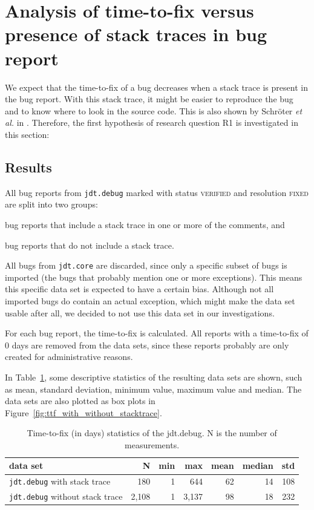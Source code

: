 \section{Analysis of time-to-fix versus presence of stack traces in bug report} %
\label{sec:analysis_of_ttf_vs_presence_of_stack_trace_in_bug_report}
We expect that the time-to-fix of a bug decreases when a stack trace is present in the bug report. With this stack trace, it might be easier to reproduce the bug and to know where to look in the source code. This is also shown by Schr\"{o}ter \emph{et al.} in \cite{Schroter2010}. Therefore, the first hypothesis of research question R1 is investigated in this section:

\vspace{\baselineskip}
\hypba{}

\subsection{Results} %
All bug reports from \texttt{jdt.debug} marked with status \textsc{verified} and resolution \textsc{fixed} are split into two groups: 

\begin{enumerate*}
	\item bug reports that include a stack trace in one or more of the comments, and
	\item bug reports that do not include a stack trace.
\end{enumerate*}

All bugs from \texttt{jdt.core} are discarded, since only a specific subset of bugs is imported (the bugs that probably mention one or more exceptions). This means this specific data set is expected to have a certain bias. Although not all imported bugs do contain an actual exception, which might make the data set usable after all, we decided to not use this data set in our investigations.

For each bug report, the time-to-fix is calculated. All reports with a time-to-fix of $0$ days are removed from the data sets, since these reports probably are only created for administrative reasons.

In Table~\ref{tab:ttf_stats}, some descriptive statistics of the resulting data sets are shown, such as mean, standard deviation, minimum value, maximum value and median. The data sets are also plotted as box plots in Figure~\ref{fig:ttf_with_without_stacktrace}.

\begin{table}[!ht]\footnotesize
	\centering
	\begin{tabular}{lrrrrrr}
		\toprule
		data set & N & min & max & mean & median & std \\
		\midrule
		\texttt{jdt.debug} with stack trace & 180 & 1 & 644 & 62 & 14 & 108 \\
		\texttt{jdt.debug} without stack trace & 2,108 & 1 & 3,137 & 98 & 18 & 232 \\
		\bottomrule
	\end{tabular} 
	\caption{Time-to-fix (in days) statistics of the jdt.debug. N is the number of measurements.}
	\label{tab:ttf_stats}
\end{table}
 
